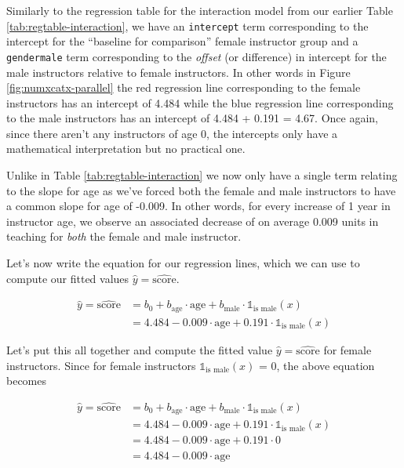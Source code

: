 \documentclass[12pt, krantz2,]{krantz}
\begin{document}
Similarly to the regression table for the interaction model from our earlier Table \ref{tab:regtable-interaction}, we have an \texttt{intercept} term corresponding to the intercept for the ``baseline for comparison'' female instructor group and a \texttt{gendermale} term corresponding to the \emph{offset} (or difference) in intercept for the male instructors relative to female instructors. In other words in Figure \ref{fig:numxcatx-parallel} the red regression line corresponding to the female instructors has an intercept of 4.484 while the blue regression line corresponding to the male instructors has an intercept of 4.484 + 0.191 = 4.67. Once again, since there aren't any instructors of age 0, the intercepts only have a mathematical interpretation but no practical one.

Unlike in Table \ref{tab:regtable-interaction} we now only have a single term relating to the slope for age as we've forced both the female and male instructors to have a common slope for age of -0.009. In other words, for every increase of 1 year in instructor age, we observe an associated decrease of on average 0.009 units in teaching for \emph{both} the female and male instructor.

Let's now write the equation for our regression lines, which we can use to compute our fitted values \(\widehat{y} = \widehat{\text{score}}\).

\[
\begin{aligned}
\widehat{y} = \widehat{\text{score}} &= b_0 + b_{\mbox{age}} \cdot \mbox{age} + b_{\mbox{male}} \cdot \mathbb{1}_{\mbox{is male}}(x)\\
&= 4.484 -0.009 \cdot \mbox{age} + 0.191 \cdot \mathbb{1}_{\mbox{is male}}(x) 
\end{aligned}
\]

Let's put this all together and compute the fitted value \(\widehat{y} = \widehat{\text{score}}\) for female instructors. Since for female instructors \(\mathbb{1}_{\mbox{is male}}(x)\) = 0, the above equation becomes

\[
\begin{aligned}
\widehat{y} = \widehat{\text{score}} &= b_0 + b_{\mbox{age}} \cdot \mbox{age} + b_{\mbox{male}} \cdot \mathbb{1}_{\mbox{is male}}(x)\\
&= 4.484 -0.009 \cdot \mbox{age} + 0.191 \cdot \mathbb{1}_{\mbox{is male}}(x)\\
&= 4.484 -0.009 \cdot \mbox{age} + 0.191 \cdot 0\\
&= 4.484 -0.009 \cdot \mbox{age}
\end{aligned}
\]
\end{document}
